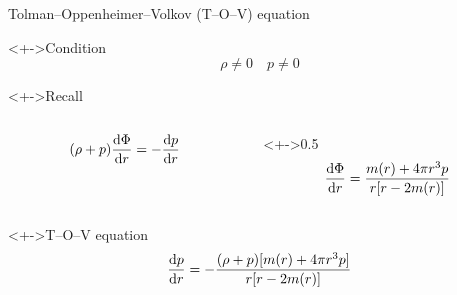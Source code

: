 \documentclass{beamer}
\let\svthefootnote\thefootnote
\newcommand\blankfootnote[1]{%
  \let\thefootnote\relax\footnotetext{#1}%
  \let\thefootnote\svthefootnote%
}
\begin{document}
\begin{frame}{Tolman--Oppenheimer--Volkov (T--O--V) equation}

\begin{block}<+->{Condition}
\begin{displaymath}
  \rho \neq 0 \quad p \neq 0
\end{displaymath}
\end{block}

\begin{block}<+->{Recall}

\begin{columns}[c]
\begin{column}{0.5\textwidth}
\begin{displaymath}
  (\rho + p) \dv{\Phi}{r} = -\dv{p}{r}
\end{displaymath}
\end{column}

\begin{column}<+->{0.5\textwidth}
\begin{displaymath}
  \dv{\Phi}{r} = \frac{m(r) + 4 \pi r^3 p}{r [r - 2 m(r)]}
\end{displaymath}
\end{column}
\end{columns}

\end{block}

\begin{block}<+->{T--O--V equation}
\begin{displaymath}
  \dv{p}{r} =
 -\frac{(\rho + p) [m(r) + 4 \pi r^3 p]}{r [r - 2m(r)]}
\end{displaymath}
\end{block}

\blankfootnote{\textcite[pp. 261--264]{Schutz}}



\end{frame}

\end{document}

